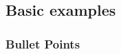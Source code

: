 \documentclass{beamer}
\begin{document}

\subsection{Basic examples}

\begin{frame}
\frametitle{Bullet Points}
\end{frame}

\end{document}
